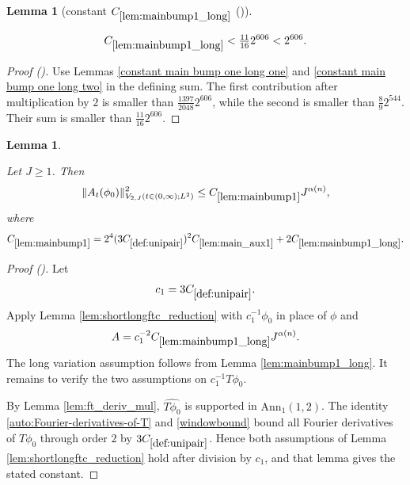 \documentclass[12pt,reqno]{amsart}
\newcommand{\auto}{{({\tiny\faCar})}}
\theoremstyle{plain}
\newtheorem{lemma}[theorem]{Lemma}
\numberwithin{equation}{section}
\theoremstyle{remark}
\newcommand{\uses}[1]{}
\newcommand{\usesdefs}[1]{}
\newcommand{\leanok}{}
\newcommand{\lean}[1]{}
\begin{document}
\begin{lemma}[constant $C_{\ref{lem:mainbump1_long}}$ \auto]\label{constant main bump one long}\uses{constant main bump one long one,constant main bump one long two,lem:mainbump1_long}\usesdefs{}
\lean{Auto.constantMainBumpOneLong}
\leanok
\begin{equation}\label{constant main bump one long bound}
C_{\ref{lem:mainbump1_long}}<\tfrac{11}{16}2^{606}<2^{606}.
\end{equation}
\end{lemma}
\begin{proof}[Proof \auto]
Use Lemmas \ref{constant main bump one long one} and \ref{constant main bump one long two} in the defining sum. The first contribution after multiplication by $2$ is smaller than $\frac{1397}{2048}2^{606}$, while the second is smaller than $\frac89 2^{544}$. Their sum is smaller than $\frac{11}{16}2^{606}$.
\end{proof}

\begin{lemma}\label{lem:mainbump1}\uses{lem:shortlongftc_reduction,lem:mainbump1_long,lem:ft_deriv_mul}\usesdefs{A_def,def:cn-window,def:unipair}
\lean{Auto.mainBumpOne}
\leanok
Let $J\ge1$. Then
\begin{equation}\label{mainbump1}
\|A_t(\phi_0)\|_{V_{2,J}(t\in(0,\infty);L^2)}^2
\le C_{\ref{lem:mainbump1}}J^{\alpha(n)},
\end{equation}
where
\begin{equation}\label{auto:main-bump-one-constant-definition}
C_{\ref{lem:mainbump1}}
=2^4(3C_{\ref{def:unipair}})^2C_{\ref{lem:main_aux1}}
+2C_{\ref{lem:mainbump1_long}}.
\end{equation}
\end{lemma}

\begin{proof}[Proof \auto]
Let
\[
c_1=3C_{\ref{def:unipair}}.
\]
Apply Lemma \ref{lem:shortlongftc_reduction} with $c_1^{-1}\phi_0$ in place of $\phi$ and
\[
A=c_1^{-2}C_{\ref{lem:mainbump1_long}}J^{\alpha(n)}.
\]
The long variation assumption follows from Lemma \ref{lem:mainbump1_long}. It remains to verify the two assumptions on $c_1^{-1}T\phi_0$.

By Lemma \ref{lem:ft_deriv_mul}, $\widehat{T\phi_0}$ is supported in $\mathrm{Ann}_1(1,2)$. The identity \eqref{auto:Fourier-derivatives-of-T} and \eqref{windowbound} bound all Fourier derivatives of $T\phi_0$ through order $2$ by $3C_{\ref{def:unipair}}$. Hence both assumptions of Lemma \ref{lem:shortlongftc_reduction} hold after division by $c_1$, and that lemma gives the stated constant.
\end{proof}
\end{document}

